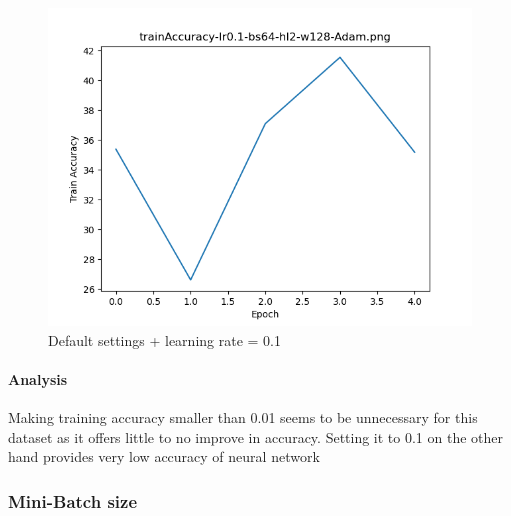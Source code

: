 \documentclass{article}[12pt]
\begin{document}
        \begin{figure}[H]
        \includegraphics[width=\linewidth]{testsResults/trainAccuracy/trainAccuracy-lr0.1-bs64-hl2-w128-Adam.png}
        \caption{Default settings + learning rate = 0.1}
        \endminipage
    \end{figure}

    \paragraph{Analysis} Making training accuracy smaller than 0.01 seems to be unnecessary for this dataset as it offers little to no improve in accuracy. Setting it to 0.1 on the other hand provides very low accuracy of neural network

\subsubsection{Mini-Batch size}
\end{document}
